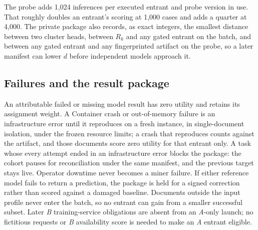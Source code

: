 The probe adds 1,024 inferences per executed entrant and probe version in use.
That roughly doubles an entrant's scoring at 1,000 cases and adds a quarter at
4,000. The private package also records, as exact integers, the smallest distance
between two cluster heads, between \(R_k\) and any gated entrant on the batch, and
between any gated entrant and any fingerprinted artifact on the probe, so a
later manifest can lower \(d\) before independent models approach it.

\subsection{Failures and the result package}\label{aggregation-and-failure-policy}

An attributable failed or missing model result has zero utility and retains its
assignment weight. A Container crash or out-of-memory failure is an
infrastructure error until it reproduces on a fresh instance, in
single-document isolation, under the frozen resource limits; a crash that
reproduces counts against the artifact, and those documents score zero utility
for that entrant only. A task whose every attempt ended in an infrastructure
error blocks the package: the cohort pauses for reconciliation under the same
manifest, and the previous target stays live. Operator downtime never becomes a
miner failure. If either reference model fails to return a prediction, the
package is held for a signed correction rather than scored against a damaged
baseline. Documents outside the input profile never enter the batch, so no
entrant can gain from a smaller successful subset. Later \textit{B}
training-service obligations are absent from an \textit{A}-only launch; no
fictitious requests or \textit{B} availability score is needed to make an
\textit{A} entrant eligible.


